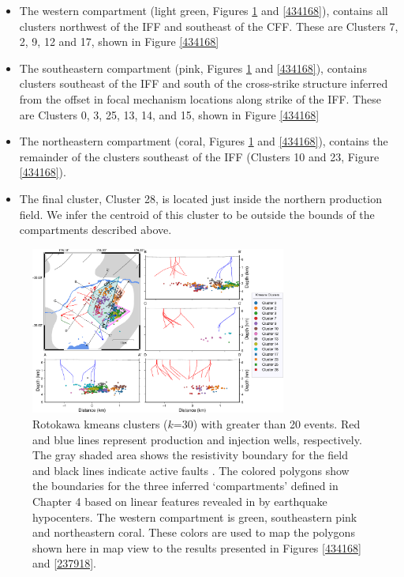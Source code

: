 \begin{itemize}
\item{The western compartment (light green, Figures \ref{878143} and \ref{434168}), contains all clusters northwest of the \acrshort{IFF} and southeast of the \acrshort{CFF}. These are Clusters 7, 2, 9, 12 and 17, shown in Figure \ref{434168}}
\item{The southeastern compartment (pink, Figures \ref{878143} and \ref{434168}), contains clusters southeast of the \acrshort{IFF} and south of the cross-strike structure inferred from the offset in focal mechanism locations along strike of the \acrshort{IFF}. These are Clusters 0, 3, 25, 13, 14, and 15, shown in Figure \ref{434168}}
\item{The northeastern compartment (coral, Figures \ref{878143} and \ref{434168}), contains the remainder of the clusters southeast of the \acrshort{IFF} (Clusters 10 and 23, Figure \ref{434168}).}
\item{The final cluster, Cluster 28, is located just inside the northern production field. We infer the centroid of this cluster to be outside the bounds of the compartments described above.}
\end{itemize}

\begin{figure}
\begin{center}
\includegraphics[width=0.75\textwidth,height=\textheight,keepaspectratio]{Chapter_5_FMs/figures/merc_Rot_GC_dets_kmeans_30/merc_Rot_kmeans_dets_30_comps}
\caption[Rotokawa kmeans clusters]{{
Rotokawa kmeans clusters ($k$=30) with greater than 20 events. Red and blue lines represent production and injection wells, respectively. The gray shaded area shows the resistivity boundary for the field \citep{Risk_2000} and black lines indicate active faults \citep{AFDB}. The colored polygons show the boundaries for the three inferred `compartments' defined in Chapter 4 based on linear features revealed in by earthquake hypocenters. The western compartment is green, southeastern pink and northeastern coral. These colors are used to map the polygons shown here in map view to the results presented in Figures \ref{434168} and \ref{237918}. 
{\label{878143}}%
}}
\end{center}
\end{figure}

